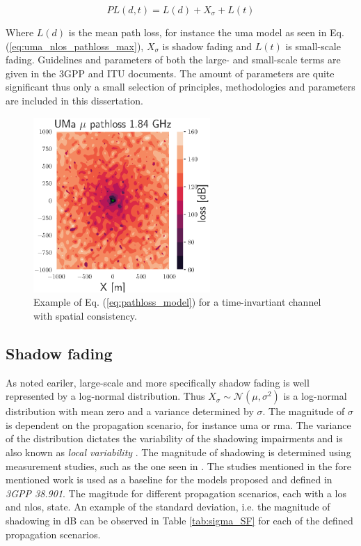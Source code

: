 \begin{equation}\label{eq:pathloss_model}
  PL(d,t) = L(d) + X_\sigma + L(t)
\end{equation}

Where $L(d)$ is the mean path loss, for instance the \gls{uma} model as seen in Eq. (\ref{eq:uma_nlos_pathloss_max}), $X_\sigma$ is shadow fading and $L(t)$ is small-scale fading. Guidelines and parameters of both the large- and small-scale terms are given in the 3GPP and ITU documents. The amount of parameters are quite significant thus only a small selection of principles, methodologies and parameters are included in this dissertation. 

\begin{figure}
    \centering
    \includegraphics[width=0.6\textwidth]{chapters/part_pathloss/figures/UMaPL.eps}
    \caption{Example of Eq. (\ref{eq:pathloss_model}) for a time-invartiant channel with spatial consistency.}
\end{figure}


\subsection{Shadow fading}

As noted eariler, large-scale and more specifically shadow fading is well represented by a log-normal distribution. Thus $X_\sigma \sim \mathcal{N}(\mu, \sigma^2)$ is a log-normal distribution with mean zero and a variance determined by $\sigma$. The magnitude of $\sigma$ is dependent on the propagation scenario, for instance \gls{uma} or \gls{rma}. The variance of the distribution dictates the variability of the shadowing impairments and is also known as \emph{local variability} \cite{Perez-Fontan2008}. The magnitude of shadowing is determined using measurement studies, such as the one seen in \cite{Sun2016}. The studies mentioned in the fore mentioned work is used as a baseline for the models proposed and defined in \textit{3GPP 38.901}. The magitude for different propagation scenarios, each with a \gls{los} and \gls{nlos}, state. An example of the standard deviation, i.e. the magnitude of shadowing in dB can be observed in Table \ref{tab:sigma_SF} for each of the defined propagation scenarios.



